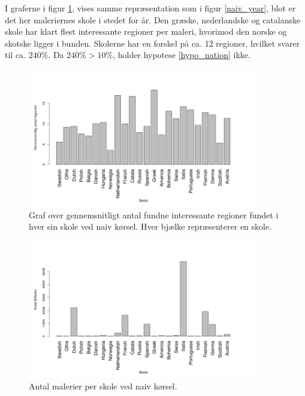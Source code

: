 {I graferne i figur \ref{naiv_nation}, vises samme repræsentation som i
figur \ref{naiv_year}, blot er det her maleriernes skole i stedet for
år. Den græske, nederlandske og catalanske skole har klart flest
interessante regioner per maleri, hvorimod den norske og skotske ligger
i bunden.  Skolerne har en forskel på ca. 12 regioner, hvilket svarer
til ca.  $240\%$. Da $240 \% > 10 \%$, holder hypotese \ref{hypo_nation}
ikke.

\begin{figure}[!h]
	\centering
	\includegraphics[angle=0,width=0.90\textwidth]{afsnit/resultater/billeder/nationcut.png}
    \caption{Graf over gennemsnitligt antal fundne interessante regioner
    fundet i hver sin skole ved naiv kørsel. Hver bjælke
    repræsenterer en skole.}
	\label{naiv_nation}
\end{figure}

\begin{figure}[!h]
	\centering
	\includegraphics[angle=0,width=0.90\textwidth]{afsnit/resultater/billeder/nationNrImage.png}
	\caption{Antal malerier per skole ved naiv kørsel.}
	\label{naiv_nationNrImage}
\end{figure}

}
